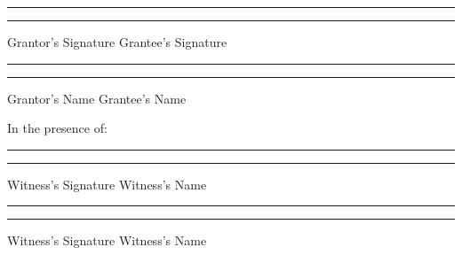 \documentclass[12pt]{article}
\begin{document}
\vspace{5em}


\rule{5cm}{0.15mm}\hspace{10em}\rule{5cm}{0.15mm}

Grantor's Signature \hspace{12.5em} Grantee's Signature

\vspace{3em}

\rule{5cm}{0.15mm}\hspace{10em}\rule{5cm}{0.15mm}

Grantor's Name \hspace{14.5em} Grantee's Name

\vspace{4em}
In the presence of:
\vspace{3em}

\rule{5cm}{0.15mm}\hspace{10em}\rule{5cm}{0.15mm}

Witness's Signature \hspace{13em} Witness's Name

\vspace{3em}

\rule{5cm}{0.15mm}\hspace{10em}\rule{5cm}{0.15mm}

Witness's Signature \hspace{13em} Witness's Name

    
\end{document}
